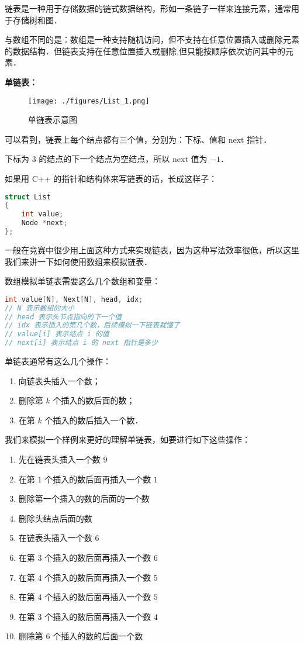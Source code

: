 
链表是一种用于存储数据的链式数据结构，形如一条链子一样来连接元素，通常用于存储树和图．

与数组不同的是：数组是一种支持随机访问，但不支持在任意位置插入或删除元素的数据结构．但链表支持在任意位置插入或删除,但只能按顺序依次访问其中的元素．

\textbf{单链表：}

\begin{figure}[ht]
\centering
\texttt{[image: ./figures/List\_1.png]}
\caption{单链表示意图} \label{List_fig1}
\end{figure}

可以看到，链表上每个结点都有三个值，分别为：下标、值和 $\text{next}$ 指针．

下标为 $3$ 的结点的下一个结点为空结点，所以 $\text{next}$ 值为 $-1$．

如果用 C++ 的指针和结构体来写链表的话，长成这样子：
\begin{lstlisting}[language=cpp]
struct List
{
    int value;
    Node *next;
};
\end{lstlisting}

一般在竞赛中很少用上面这种方式来实现链表，因为这种写法效率很低，所以这里我们来讲一下如何使用数组来模拟链表．

数组模拟单链表需要这么几个数组和变量：
\begin{lstlisting}[language=cpp]
int value[N], Next[N], head, idx;
// N 表示数组的大小
// head 表示头节点指向的下一个值
// idx 表示插入的第几个数，后续模拟一下链表就懂了
// value[i] 表示结点 i 的值
// next[i] 表示结点 i 的 next 指针是多少
\end{lstlisting}

单链表通常有这么几个操作：
\begin{enumerate}
\item 向链表头插入一个数；
\item 删除第 $k$ 个插入的数后面的数；
\item 在第 $k$ 个插入的数后插入一个数．
\end{enumerate}

我们来模拟一个样例来更好的理解单链表，如要进行如下这些操作：

\begin{enumerate}
\item 先在链表头插入一个数 $9$
\item 在第 $1$ 个插入的数后面再插入一个数 $1$
\item 删除第一个插入的数的后面的一个数
\item 删除头结点后面的数
\item 在链表头插入一个数 $6$
\item 在第 $3$ 个插入的数后面再插入一个数 $6$
\item 在第 $4$ 个插入的数后面再插入一个数 $5$
\item 在第 $4$ 个插入的数后面再插入一个数 $5$
\item 在第 $3$ 个插入的数后面再插入一个数 $4$
\item 删除第 $6$ 个插入的数的后面一个数
\end{enumerate}


